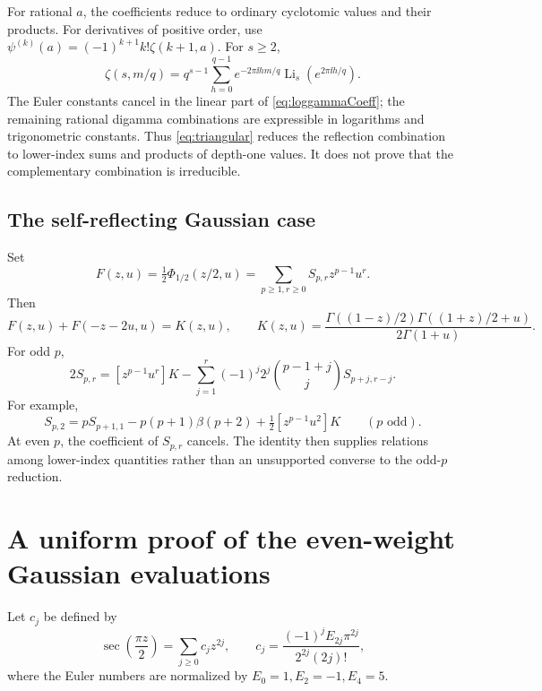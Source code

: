 \documentclass[11pt]{article}
\numberwithin{equation}{section}
\theoremstyle{definition}\newtheorem{definition}[theorem]{Definition}
\theoremstyle{remark}\newtheorem{remark}[theorem]{Remark}
\DeclareMathOperator{\Li}{Li}
\begin{document}
For rational $a$, the coefficients reduce to ordinary cyclotomic values and their products. For derivatives of positive order, use
$\psi^{(k)}(a)=(-1)^{k+1}k!\zeta(k+1,a)$. For $s\ge2$,
\[
 \zeta(s,m/q)=q^{s-1}\sum_{h=0}^{q-1}
 e^{-2\pi\ii hm/q}\Li_s(e^{2\pi\ii h/q}).
\]
The Euler constants cancel in the linear part of \eqref{eq:loggammaCoeff}; the remaining rational digamma combinations are expressible in logarithms and trigonometric constants. Thus \eqref{eq:triangular} reduces the reflection combination to lower-index sums and products of depth-one values. It does not prove that the complementary combination is irreducible.

\subsection{The self-reflecting Gaussian case}
Set
\[
 F(z,u)=\tfrac12\Phi_{1/2}(z/2,u)
       =\sum_{p\ge1,r\ge0}S_{p,r}z^{p-1}u^r.
\]
Then
\begin{equation}\label{eq:Freflection}
 F(z,u)+F(-z-2u,u)=K(z,u),\qquad
 K(z,u)=\frac{\Gamma((1-z)/2)\Gamma((1+z)/2+u)}{2\Gamma(1+u)}.
\end{equation}
For odd $p$,
\begin{equation}\label{eq:GaussianTriangle}
 2S_{p,r}=[z^{p-1}u^r]K
   -\sum_{j=1}^r(-1)^j2^j\binom{p-1+j}{j}S_{p+j,r-j}.
\end{equation}
For example,
\[
 S_{p,2}=pS_{p+1,1}-p(p+1)\beta(p+2)
               +\tfrac12[z^{p-1}u^2]K\qquad(p\text{ odd}).
\]
At even $p$, the coefficient of $S_{p,r}$ cancels. The identity then supplies relations among lower-index quantities rather than an unsupported converse to the odd-$p$ reduction.

\section{A uniform proof of the even-weight Gaussian evaluations}
\label{sec:odd}

Let $c_j$ be defined by
\begin{equation}\label{eq:sec}
 \sec\left(\frac{\pi z}{2}\right)=\sum_{j\ge0}c_jz^{2j},
 \qquad c_j=\frac{(-1)^j E_{2j}\pi^{2j}}{2^{2j}(2j)!},
\end{equation}
where the Euler numbers are normalized by $E_0=1,E_2=-1,E_4=5$.
\end{document}
